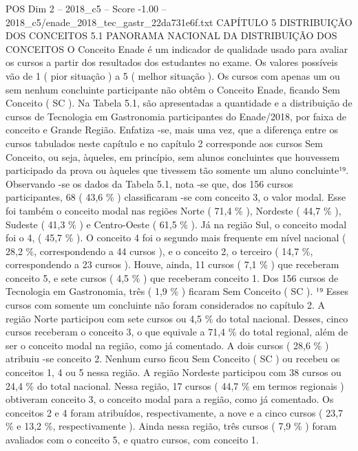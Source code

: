 \begin{textsample}{POS Dim 2 – 2018\_c5 – Score -1.00 – 2018\_c5/enade\_2018\_tec\_gastr\_22da731e6f.txt}  \label{ex:f2_pos_320}
CAPÍTULO 5 DISTRIBUIÇÃO DOS CONCEITOS 5.1 PANORAMA NACIONAL DA DISTRIBUIÇÃO DOS CONCEITOS O Conceito Enade é um indicador de qualidade usado para avaliar os cursos a partir dos resultados dos estudantes no exame.
Os valores possíveis vão de 1 ( pior situação ) a 5 ( melhor situação ).
Os cursos com apenas um ou sem nenhum concluinte participante não obtêm o Conceito Enade, ficando Sem Conceito ( SC ).
Na Tabela 5.1, são apresentadas a quantidade e a distribuição de cursos de Tecnologia em Gastronomia participantes do Enade/2018, por faixa de conceito e Grande Região.
Enfatiza -se, mais uma vez, que a diferença entre os cursos tabulados neste capítulo e no capítulo 2 corresponde aos cursos Sem Conceito, ou seja, àqueles, em princípio, sem alunos concluintes que houvessem participado da prova ou àqueles que tivessem tão somente um aluno concluinte¹⁹.
Observando -se os dados da Tabela 5.1, nota -se que, dos 156 cursos participantes, 68 ( 43,6 \% ) classificaram -se com conceito 3, o valor modal.
Esse foi também o conceito modal nas regiões Norte ( 71,4 \% ), Nordeste ( 44,7 \% ), Sudeste ( 41,3 \% ) e Centro-Oeste ( 61,5 \% ).
Já na região Sul, o conceito modal foi o 4, ( 45,7 \% ).
O conceito 4 foi o segundo mais frequente em nível nacional ( 28,2 \%, correspondendo a 44 cursos ), e o conceito 2, o terceiro ( 14,7 \%, correspondendo a 23 cursos ).
Houve, ainda, 11 cursos ( 7,1 \% ) que receberam conceito 5, e sete cursos ( 4,5 \% ) que receberam conceito 1.
Dos 156 cursos de Tecnologia em Gastronomia, três ( 1,9 \% ) ficaram Sem Conceito ( SC ). ¹⁹ Esses cursos com somente um concluinte não foram considerados no capítulo 2.
A região Norte participou com sete cursos ou 4,5 \% do total nacional.
Desses, cinco cursos receberam o conceito 3, o que equivale a 71,4 \% do total regional, além de ser o conceito modal na região, como já comentado.
A dois cursos ( 28,6 \% ) atribuiu -se conceito 2.
Nenhum curso ficou Sem Conceito ( SC ) ou recebeu os conceitos 1, 4 ou 5 nessa região.
A região Nordeste participou com 38 cursos ou 24,4 \% do total nacional.
Nessa região, 17 cursos ( 44,7 \% em termos regionais ) obtiveram conceito 3, o conceito modal para a região, como já comentado.
Os conceitos 2 e 4 foram atribuídos, respectivamente, a nove e a cinco cursos ( 23,7 \% e 13,2 \%, respectivamente ).
Ainda nessa região, três cursos ( 7,9 \% ) foram avaliados com o conceito 5, e quatro cursos, com conceito 1.

\end{textsample}
